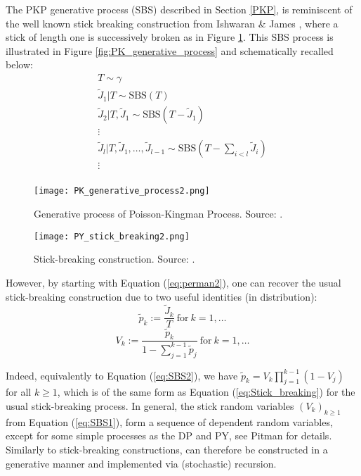 The \gls{PKP} generative process (\acrlong{SBS}) described in Section \ref{PKP}, is reminiscent of the well known stick breaking construction from Ishwaran \& James \cite{Ishwaran:2001dw}, where a stick of length one is successively broken as in Figure \ref{fig:PY_stick_breaking}.
This \gls{SBS} process is illustrated in Figure \ref{fig:PK_generative_process} and schematically recalled below:
\begin{gather*}
T \sim \gamma \\
\tilde{J}_1|T \sim \text{SBS}(T) \\
\tilde{J}_2|T,\tilde{J}_1 \sim \text{SBS}(T - \tilde{J}_1) \\
\vdots \\
\tilde{J}_{l}|T,\tilde{J}_1,\dots,\tilde{J}_{l-1} \sim \text{SBS}(T - \sum_{i<l} \tilde{J}_i) \\
\vdots \\
\end{gather*}
\begin{figure}[h!]
  \centering
  \begin{minipage}[b]{0.48\textwidth}
    \texttt{[image: PK\_generative\_process2.png]}
    \caption{Generative process of Poisson-Kingman Process. Source: \cite{LomeliThesis}.}
    \label{fig:PK_generative_process}
  \end{minipage}
  \hfill
  \begin{minipage}[b]{0.48\textwidth}
    \texttt{[image: PY\_stick\_breaking2.png]}
    \caption{Stick-breaking construction. Source: \cite{LomeliThesis}.}
    \label{fig:PY_stick_breaking}
  \end{minipage}
\end{figure}
However, by starting with Equation (\ref{eq:perman2}), one can recover the usual stick-breaking construction due to two useful identities (in distribution):
\begin{equation} \label{eq:SBS1}
\tilde{p}_k := \frac{\tilde{J}_k}{T} \ \text{for} \ k=1,\dots
\end{equation}
\begin{equation} \label{eq:SBS2}
V_k := \frac{\tilde{p}_k}{1 - \sum_{j=1}^{k-1}{\tilde{p}_j}} \ \text{for} \ k=1,\dots
\end{equation}

Indeed, equivalently to Equation (\ref{eq:SBS2}), we have $\tilde{p}_k = V_k \prod_{j=1}^{k-1}{(1-V_j)}$ for all $k \ge 1$, which is of the same form as Equation (\ref{eq:Stick_breaking}) for the usual stick-breaking process.
In general, the stick random variables $(V_k)_{k \ge 1}$ from Equation (\ref{eq:SBS1}), form a sequence of dependent random variables, except for some simple processes as the \gls{DP} and \gls{PY}, see Pitman \cite{PitmanRDD} for details.
Similarly to stick-breaking constructions,  can therefore be constructed in a generative manner and implemented via (stochastic) recursion.

